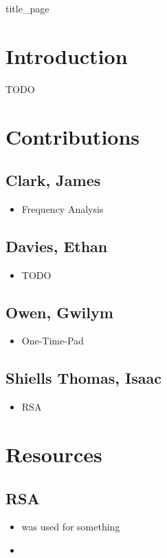 \documentclass[11pt]{article}
\begin{document}
\raggedcolumns

{title_page}


\begin{multicols}{2}
	\begin{spacing}{1.125}
		\tableofcontents

		\section{Introduction}
		TODO





		\section{Contributions}
		\subsection{Clark, James}
		\begin{itemize}
			\item Frequency Analysis
		\end{itemize}
		\subsection{Davies, Ethan}
		\begin{itemize}
			\item TODO
		\end{itemize}
		\subsection{Owen, Gwilym}
		\begin{itemize}
			\item One-Time-Pad
		\end{itemize}
		\subsection{Shiells Thomas, Isaac}
		\begin{itemize}
			\item RSA
		\end{itemize}

		\section{Resources}
		\subsection{RSA}
		\begin{itemize}
			\item[\cite{rfc4253}] was used for something
			\item[\cite{101computing_frequency_analysis_2019}]
			\nocite{rfc4253}
		\end{itemize}
		
		
		\printbibliography

	\end{spacing}
\end{multicols}
\end{document}
